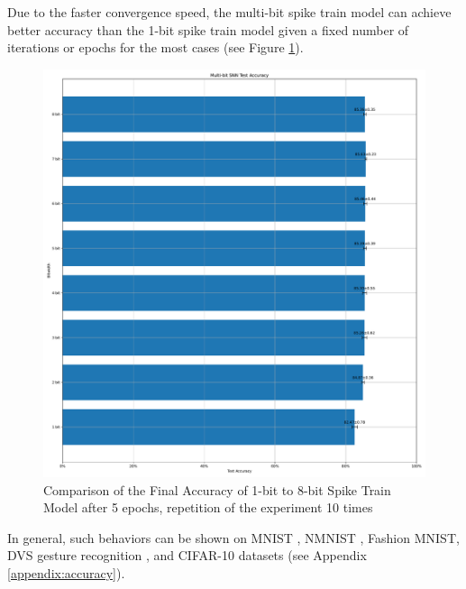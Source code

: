         Due to the faster convergence speed, the multi-bit spike train model can achieve better accuracy than the 1-bit spike train model given a fixed number of iterations or epochs for the most cases (see Figure \ref{fig:final_accuracy}).
        \begin{figure}[!htpb]
            \centering
            \includegraphics[width=\textwidth]{../standard/FashionMNIST/plots/fashionmnist_final_acc.pdf}
            \caption{Comparison of the Final Accuracy of 1-bit to 8-bit Spike Train Model after 5 epochs, repetition of the experiment 10 times}
            \label{fig:final_accuracy}
        \end{figure}

        In general, such behaviors can be shown on MNIST \cite{deng2012mnist}, NMNIST \cite{10.3389/fnins.2015.00437}, Fashion MNIST, DVS gesture recognition \cite{8100264}, and CIFAR-10 datasets (see Appendix \ref{appendix:accuracy}).

